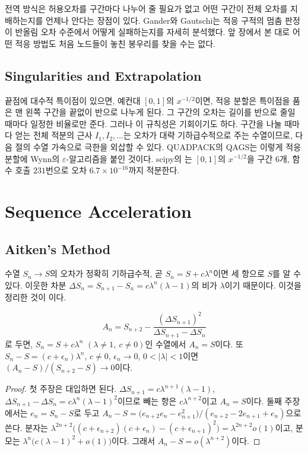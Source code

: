 전역 방식은 허용오차를 구간마다 나누어 줄 필요가 없고 어떤 구간이 전체 오차를 지배하는지를 언제나 안다는 장점이 있다. Gander와 Gautschi는 적응 구적의 멈춤 판정이 반올림 오차 수준에서 어떻게 실패하는지를 자세히 분석했다\cite{gander2000}. 앞 장에서 본 대로 어떤 적응 방법도 처음 노드들이 놓친 봉우리를 찾을 수는 없다.

\subsection{Singularities and Extrapolation}

끝점에 대수적 특이점이 있으면, 예컨대 $[0,1]$의 $x^{-1/2}$이면, 적응 분할은 특이점을 품은 맨 왼쪽 구간을 끝없이 반으로 나누게 된다. 그 구간의 오차는 길이를 반으로 줄일 때마다 일정한 비율로만 준다. 그러나 이 규칙성은 기회이기도 하다. 구간을 나눌 때마다 얻는 전체 적분의 근사 $I_1,I_2,\dots$는 오차가 대략 기하급수적으로 주는 수열이므로, 다음 절의 수열 가속으로 극한을 외삽할 수 있다. QUADPACK의 QAGS는 이렇게 적응 분할에 Wynn의 $\varepsilon$-알고리즘을 붙인 것이다\cite{dedoncker1978,piessens1983quadpack}. scipy의 는 $[0,1]$의 $x^{-1/2}$을 구간 $6$개, 함수 호출 $231$번으로 오차 $6.7\times10^{-16}$까지 적분한다.

\section{Sequence Acceleration}
\label{sec:acceleration}

\subsection{Aitken's Method}

수열 $S_n\to S$의 오차가 정확히 기하급수적, 곧 $S_n=S+c\lambda^n$이면 세 항으로 $S$를 알 수 있다. 이웃한 차분 $\Delta S_n=S_{n+1}-S_n=c\lambda^n(\lambda-1)$의 비가 $\lambda$이기 때문이다. 이것을 정리한 것이 이다\cite{aitken1926}.

\begin{proposition}
\label{prop:aitken}
\[
A_n=S_{n+2}-\frac{(\Delta S_{n+1})^2}{\Delta S_{n+1}-\Delta S_n}
\]
로 두면, $S_n=S+c\lambda^n$ $(\lambda\ne1,\ c\ne0)$인 수열에서 $A_n=S$이다. 또 $S_n-S=(c+\epsilon_n)\lambda^n$, $c\ne0$, $\epsilon_n\to0$, $0<|\lambda|<1$이면 $(A_n-S)/(S_{n+2}-S)\to0$이다.
\end{proposition}

\begin{proof}
첫 주장은 대입하면 된다. $\Delta S_{n+1}=c\lambda^{n+1}(\lambda-1)$, $\Delta S_{n+1}-\Delta S_n=c\lambda^n(\lambda-1)^2$이므로 빼는 항은 $c\lambda^{n+2}$이고 $A_n=S$이다. 둘째 주장에서는 $e_n=S_n-S$로 두고 $A_n-S=\bigl(e_{n+2}e_n-e_{n+1}^2\bigr)/(e_{n+2}-2e_{n+1}+e_n)$으로 쓴다. 분자는 $\lambda^{2n+2}\bigl((c+\epsilon_{n+2})(c+\epsilon_n)-(c+\epsilon_{n+1})^2\bigr)=\lambda^{2n+2}o(1)$이고, 분모는 $\lambda^n\bigl(c(\lambda-1)^2+o(1)\bigr)$이다. 그래서 $A_n-S=o(\lambda^{n+2})$이다.
\end{proof}

